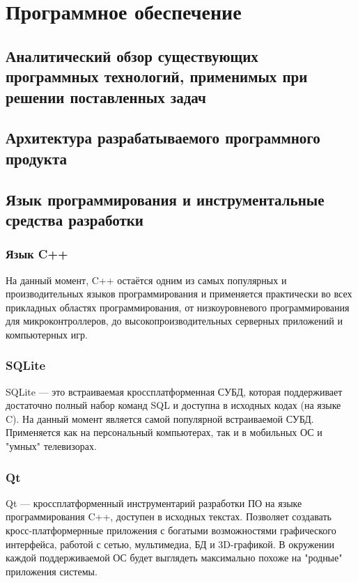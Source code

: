 \newpage
\section{Программное обеспечение}

\subsection{Аналитический обзор существующих программных технологий, применимых при решении поставленных задач}
\subsection{Архитектура разрабатываемого программного продукта}
\subsection{Язык программирования и инструментальные средства разработки}

\subsubsection{Язык C++}
На данный момент, C++ остаётся одним из самых популярных и производительных языков программирования и применяется практически во всех прикладных областях
программирования, от низкоуровневого программирования для микроконтроллеров, до высокопроизводительных серверных приложений и компьютерных игр.

\subsubsection{SQLite}
SQLite — это встраиваемая кроссплатформенная СУБД, которая поддерживает достаточно полный набор команд SQL и доступна в исходных кодах (на языке C). На данный
момент является самой популярной встраиваемой СУБД. Применяется как на персональный компьютерах, так и в мобильных ОС и "умных" телевизорах.

\subsubsection{Qt}
Qt — кроссплатформенный инструментарий разработки ПО на языке программирования C++, доступен в исходных текстах. Позволяет создавать кросс-платформернные приложения с богатыми возможностями
графического интерфейса, работой с сетью, мультимедиа, БД и 3D-графикой. В окружении каждой поддерживаемой ОС будет выглядеть максимально похоже на "родные" приложения
системы.

